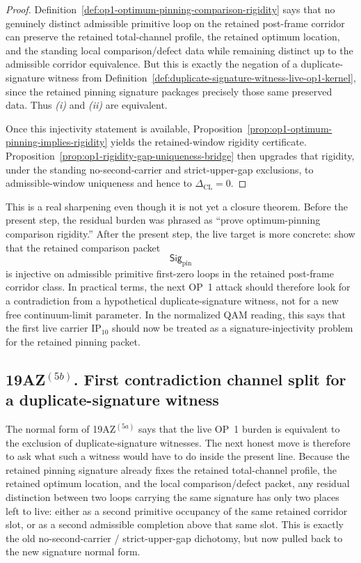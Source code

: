 \begin{proof}
Definition~\ref{def:op1-optimum-pinning-comparison-rigidity} says that no genuinely distinct admissible primitive loop on the retained post-frame corridor can preserve the retained total-channel profile, the retained optimum location, and the standing local comparison/defect data while remaining distinct up to the admissible corridor equivalence. But this is exactly the negation of a duplicate-signature witness from Definition~\ref{def:duplicate-signature-witness-live-op1-kernel}, since the retained pinning signature packages precisely those same preserved data. Thus \emph{(i)} and \emph{(ii)} are equivalent.

Once this injectivity statement is available, Proposition~\ref{prop:op1-optimum-pinning-implies-rigidity} yields the retained-window rigidity certificate. Proposition~\ref{prop:op1-rigidity-gap-uniqueness-bridge} then upgrades that rigidity, under the standing no-second-carrier and strict-upper-gap exclusions, to admissible-window uniqueness and hence to \(\Delta_{\mathrm{CL}}=0\).
\end{proof}

\begin{remark}
\label{rem:what-new-normal-form-buys-next-op1-step}
This is a real sharpening even though it is not yet a closure theorem. Before the present step, the residual burden was phrased as ``prove optimum-pinning comparison rigidity.'' After the present step, the live target is more concrete: show that the retained comparison packet
\[
\mathsf{Sig}_{\mathrm{pin}}
\]
is injective on admissible primitive first-zero loops in the retained post-frame corridor class. In practical terms, the next OP~1 attack should therefore look for a contradiction from a hypothetical duplicate-signature witness, not for a new free continuum-limit parameter. In the normalized QAM reading, this says that the first live carrier \(\mathrm{IP}_{10}\) should now be treated as a signature-injectivity problem for the retained pinning packet.
\end{remark}




\subsection*{19AZ$^{(5b)}$. First contradiction channel split for a duplicate-signature witness}
\label{sec:first-contradiction-channel-split-duplicate-signature-witness}
The normal form of 19AZ$^{(5a)}$ says that the live OP~1 burden is equivalent to the exclusion of duplicate-signature witnesses. The next honest move is therefore to ask what such a witness would have to do inside the present line. Because the retained pinning signature already fixes the retained total-channel profile, the retained optimum location, and the local comparison/defect packet, any residual distinction between two loops carrying the same signature has only two places left to live: either as a second primitive occupancy of the same retained corridor slot, or as a second admissible completion above that same slot. This is exactly the old no-second-carrier / strict-upper-gap dichotomy, but now pulled back to the new signature normal form.

